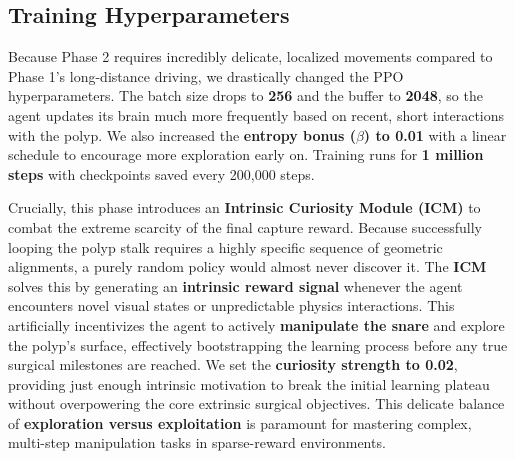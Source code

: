 \subsection{Training Hyperparameters}
Because Phase 2 requires incredibly delicate, localized movements compared to Phase 1's long-distance driving, we drastically changed the PPO hyperparameters. The batch size drops to \textbf{256} and the buffer to \textbf{2048}, so the agent updates its brain much more frequently based on recent, short interactions with the polyp. We also increased the \textbf{entropy bonus ($\beta$) to 0.01} with a linear schedule to encourage more exploration early on. Training runs for \textbf{1 million steps} with checkpoints saved every 200,000 steps.

Crucially, this phase introduces an \textbf{Intrinsic Curiosity Module (ICM)} to combat the extreme scarcity of the final capture reward. Because successfully looping the polyp stalk requires a highly specific sequence of geometric alignments, a purely random policy would almost never discover it. The \textbf{ICM} solves this by generating an \textbf{intrinsic reward signal} whenever the agent encounters novel visual states or unpredictable physics interactions. This artificially incentivizes the agent to actively \textbf{manipulate the snare} and explore the polyp's surface, effectively bootstrapping the learning process before any true surgical milestones are reached. We set the \textbf{curiosity strength to 0.02}, providing just enough intrinsic motivation to break the initial learning plateau without overpowering the core extrinsic surgical objectives. This delicate balance of \textbf{exploration versus exploitation} is paramount for mastering complex, multi-step manipulation tasks in sparse-reward environments.

